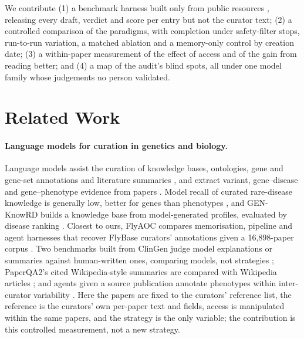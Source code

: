 \documentclass{article} %
\begin{document}
We contribute (1) a benchmark harness built only from public resources \citep{sayers2026database,Louden2020MedgenNcbis,rosonovski2024europe,seal2023genenames}, releasing every draft, verdict and score per entry but not the curator text; (2) a controlled comparison of the paradigms, with completion under safety-filter stops, run-to-run variation, a matched ablation and a memory-only control by creation date; (3) a within-paper measurement of the effect of access and of the gain from reading better; and (4) a map of the audit's blind spots, all under one model family whose judgements no person validated.

\section{Related Work}
\label{sec:related_work}
\paragraph{Language models for curation in genetics and biology.}
Language models assist the curation of knowledge bases, ontologies, gene and gene-set annotations and literature summaries \citep{caufield2024structured,caufield2024curategpt,toro2024dynamic,Li2025GenewhispererEnhancing,hu2025evaluation,niyonkuru2025leveraging,Green2026GoflowllmcuratingMirna,Murphy2024HarnessingGenerative,Green2023LitsummLarge}, and extract variant, gene--disease and gene--phenotype evidence from papers \citep{li2025autopm3,furlan2025eagleai,wang2026pubmind,yin2026benchmarking,twede2026evidence}. Model recall of curated rare-disease knowledge is generally low, better for genes than phenotypes \citep{groza2026systematic}, and GEN-KnowRD builds a knowledge base from model-generated profiles, evaluated by disease ranking \citep{yan2026genknowrd}. Closest to ours, FlyAOC compares memorisation, pipeline and agent harnesses that recover FlyBase curators' annotations given a 16,898-paper corpus \citep{zhang2026flyaoc}. Two benchmarks built from ClinGen judge model explanations or summaries against human-written ones, comparing models, not strategies \citep{queen2025cgbench,Saadat2026LargeLanguage}; PaperQA2's cited Wikipedia-style summaries are compared with Wikipedia articles \citep{skarlinski2024language}; and agents given a source publication annotate phenotypes within inter-curator variability \citep{balhoff2026frontier}. Here the papers are fixed to the curators' reference list, the reference is the curators' own per-paper text and fields, access is manipulated within the same papers, and the strategy is the only variable; the contribution is this controlled measurement, not a new strategy.
\end{document}
